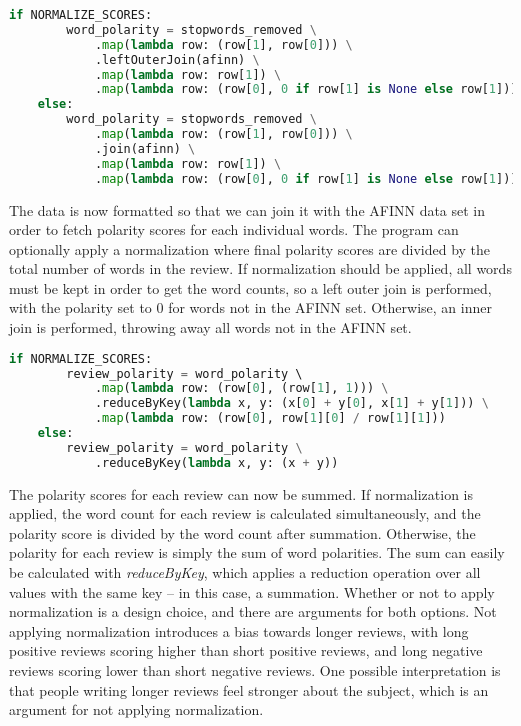 \documentclass[a4paper]{article}
\begin{document}
\begin{lstlisting}[language=python]
    if NORMALIZE_SCORES:
        word_polarity = stopwords_removed \
            .map(lambda row: (row[1], row[0])) \
            .leftOuterJoin(afinn) \
            .map(lambda row: row[1]) \
            .map(lambda row: (row[0], 0 if row[1] is None else row[1]))
    else:
        word_polarity = stopwords_removed \
            .map(lambda row: (row[1], row[0])) \
            .join(afinn) \
            .map(lambda row: row[1]) \
            .map(lambda row: (row[0], 0 if row[1] is None else row[1]))
\end{lstlisting}

The data is now formatted so that we can join it with the AFINN data set in order to fetch polarity scores for each individual words. The program can optionally apply a normalization where final polarity scores are divided by the total number of words in the review. If normalization should be applied, all words must be kept in order to get the word counts, so a left outer join is performed, with the polarity set to 0 for words not in the AFINN set. Otherwise, an inner join is performed, throwing away all words not in the AFINN set.


\begin{lstlisting}[language=python]
    if NORMALIZE_SCORES:
        review_polarity = word_polarity \ 
            .map(lambda row: (row[0], (row[1], 1))) \
            .reduceByKey(lambda x, y: (x[0] + y[0], x[1] + y[1])) \
            .map(lambda row: (row[0], row[1][0] / row[1][1]))
    else:
        review_polarity = word_polarity \
            .reduceByKey(lambda x, y: (x + y))
\end{lstlisting}

The polarity scores for each review can now be summed. If normalization is applied, the word count for each review is calculated simultaneously, and the polarity score is divided by the word count after summation. Otherwise, the polarity for each review is simply the sum of word polarities. The sum can easily be calculated with \emph{reduceByKey}, which applies a reduction operation over all values with the same key -- in this case, a summation. Whether or not to apply normalization is a design choice, and there are arguments for both options. Not applying normalization introduces a bias towards longer reviews, with long positive reviews scoring higher than short positive reviews, and long negative reviews scoring lower than short negative reviews. One possible interpretation is that people writing longer reviews feel stronger about the subject, which is an argument for not applying normalization.
\end{document}
